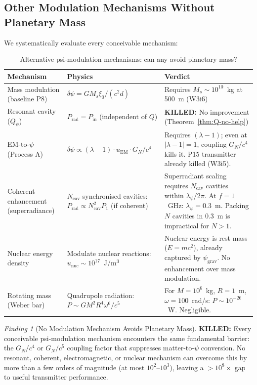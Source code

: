 \documentclass[11pt]{article}
\theoremstyle{definition}
\theoremstyle{remark}
\newtheorem{finding}[theorem]{Finding}
\newcommand{\lambdaone}{|\lambda-1|}
\newcommand{\Qpsi}{Q_\psi}
\newcommand{\psigrav}{\psi_{\mathrm{grav}}}
\newcommand{\GN}{G_N}
\newcommand{\killed}[1]{\textcolor{red!70!black}{\textbf{KILLED:} #1}}
\begin{document}
\subsection{Other Modulation Mechanisms Without Planetary Mass}

We systematically evaluate every conceivable mechanism:

\begin{table}[H]
\centering
\caption{Alternative psi-modulation mechanisms: can any avoid planetary mass?}
\label{tab:P8-mechanisms}
\begin{tabular}{@{}p{3cm}p{4.5cm}p{5cm}@{}}
\toprule
Mechanism & Physics & Verdict \\
\midrule
Mass modulation (baseline P8)
  & $\delta\psi = GM_s\xi_0/(c^2 d)$
  & Requires $M_s \sim 10^{10}$~kg at 500~m (W3i6) \\[3pt]
Resonant cavity ($\Qpsi$)
  & $P_{\mathrm{rad}} = P_{\mathrm{in}}$ (independent of $Q$)
  & \killed{No improvement} (Theorem~\ref{thm:Q-no-help}) \\[3pt]
EM-to-$\psi$ (Process A)
  & $\delta\psi \propto (\lambda-1) \cdot u_{\mathrm{EM}} \cdot \GN/c^4$
  & Requires $(\lambda-1)$; even at $\lambdaone = 1$, coupling
    $\GN/c^4$ kills it. P15 transmitter already killed (W3i5). \\[3pt]
Coherent enhancement (superradiance)
  & $N_{\mathrm{cav}}$ synchronised cavities: $P_{\mathrm{rad}}
    \propto N_{\mathrm{cav}}^2 P_1$ (if coherent)
  & Superradiant scaling requires $N_{\mathrm{cav}}$ cavities within
    $\lambda_\psi/2\pi$. At $f = 1$~GHz: $\lambda_\psi = 0.3$~m.
    Packing $N$ cavities in 0.3~m is impractical for $N > 1$. \\[3pt]
Nuclear energy density
  & Modulate nuclear reactions: $u_{\mathrm{nuc}} \sim 10^{17}$~J/m$^3$
  & Nuclear energy is rest mass ($E = mc^2$), already captured by
    $\psigrav$. No enhancement over mass modulation. \\[3pt]
Rotating mass (Weber bar)
  & Quadrupole radiation: $P \sim G M^2 R^4 \omega^6/c^5$
  & For $M = 10^6$~kg, $R = 1$~m, $\omega = 100$~rad/s:
    $P \sim 10^{-26}$~W. Negligible. \\
\bottomrule
\end{tabular}
\end{table}

\begin{finding}[No Modulation Mechanism Avoids Planetary Mass]
\label{find:no-mechanism}
\killed{Every conceivable psi-modulation mechanism encounters the same
fundamental barrier: the $\GN/c^4$ or $\GN/c^5$ coupling factor that
suppresses matter-to-$\psi$ conversion. No resonant, coherent,
electromagnetic, or nuclear mechanism can overcome this by more than
a few orders of magnitude (at most $10^2$--$10^3$), leaving a
$>10^{8}\times$ gap to useful transmitter performance.}
\end{finding}
\end{document}
